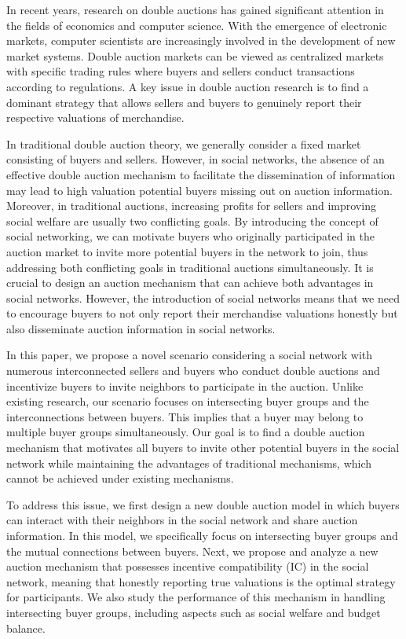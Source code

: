 In recent years, research on double auctions has gained significant attention in the fields of economics and computer science. With the emergence of electronic markets, computer scientists are increasingly involved in the development of new market systems. Double auction markets can be viewed as centralized markets with specific trading rules where buyers and sellers conduct transactions according to regulations. A key issue in double auction research is to find a dominant strategy that allows sellers and buyers to genuinely report their respective valuations of merchandise.

In traditional double auction theory, we generally consider a fixed market consisting of buyers and sellers. However, in social networks, the absence of an effective double auction mechanism to facilitate the dissemination of information may lead to high valuation potential buyers missing out on auction information. Moreover, in traditional auctions, increasing profits for sellers and improving social welfare are usually two conflicting goals. By introducing the concept of social networking, we can motivate buyers who originally participated in the auction market to invite more potential buyers in the network to join, thus addressing both conflicting goals in traditional auctions simultaneously. It is crucial to design an auction mechanism that can achieve both advantages in social networks. However, the introduction of social networks means that we need to encourage buyers to not only report their merchandise valuations honestly but also disseminate auction information in social networks.

In this paper, we propose a novel scenario considering a social network with numerous interconnected sellers and buyers who conduct double auctions and incentivize buyers to invite neighbors to participate in the auction. Unlike existing research, our scenario focuses on intersecting buyer groups and the interconnections between buyers. This implies that a buyer may belong to multiple buyer groups simultaneously. Our goal is to find a double auction mechanism that motivates all buyers to invite other potential buyers in the social network while maintaining the advantages of traditional mechanisms, which cannot be achieved under existing mechanisms.

To address this issue, we first design a new double auction model in which buyers can interact with their neighbors in the social network and share auction information. In this model, we specifically focus on intersecting buyer groups and the mutual connections between buyers. Next, we propose and analyze a new auction mechanism that possesses incentive compatibility (IC) in the social network, meaning that honestly reporting true valuations is the optimal strategy for participants. We also study the performance of this mechanism in handling intersecting buyer groups, including aspects such as social welfare and budget balance.


